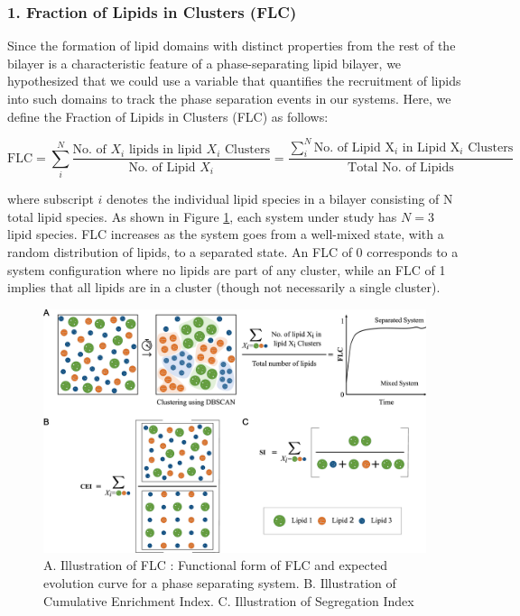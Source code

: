 \documentclass{biophys-new}
\begin{document}
\subsubsection*{1. Fraction of Lipids in Clusters (FLC)}
Since the formation of lipid domains with distinct properties from the rest of the bilayer is a characteristic feature of a phase-separating lipid bilayer,
we hypothesized that we could use a variable that quantifies the recruitment of lipids into such domains to track the phase separation events in our systems.
Here, we define the Fraction of Lipids in Clusters (FLC) as follows:

\begin{equation}
    \label{eq:FLC}
    \text{FLC} = \sum_{i}^{N} \frac{\text{No. of $X_i$ lipids in lipid $X_i$ Clusters}}{\text{No. of Lipid $X_i$}} =  \frac{\sum_{i}^{N} \text{No. of Lipid X$_i$ in Lipid X$_i$ Clusters}}{\text{Total No. of Lipids}}
\end{equation}

\noindent where subscript $i$ denotes the individual lipid species in a bilayer consisting of N total lipid species.
As shown in Figure \ref{fig2:view}, each system under study has $N=3$ lipid species.
FLC increases as the system goes from a well-mixed state, with a random distribution of lipids, to a separated state.
An FLC of 0 corresponds to a system configuration where no lipids are part of any cluster,
while an FLC of 1 implies that all lipids are in a cluster (though not necessarily a single cluster).


\begin{figure}[hbt!]
    \centering
    \includegraphics[width=6.5in]{Figures/Main/2/placeholder.jpg}
    \caption{A. Illustration of FLC :  Functional form of FLC and expected evolution curve for a phase separating system. B. Illustration of Cumulative Enrichment Index. C. Illustration of Segregation Index}
    \label{fig2:view}
\end{figure}
\end{document}
